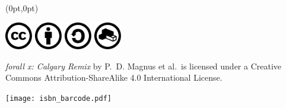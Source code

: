 \documentclass{memoir}
\newlength{\coverheight}
\newlength{\spinewidth}
\newlength{\spinepos} %
\begin{document}
\begin{textblock*}{\spinepos}(0pt,0pt)
  \noindent\hspace{1.5cm}
  \begin{minipage}[b][\coverheight][b]{.85\spinepos}
\begin{minipage}[b]{2.5cm}
\includegraphics[width=1.2cm]{assets/cc.pdf}
\includegraphics[width=1.2cm]{assets/by.pdf}
\includegraphics[width=1.2cm]{assets/sa.pdf}
\includegraphics[width=1.2cm]{assets/remix.pdf}
\end{minipage}
\hspace{.3cm}
\begin{minipage}[b]{4.7cm}
  \fontsize{11pt}{1.2em}\selectfont\color{white}\textit{forall x:
    Calgary Remix} by P.~D. Magnus et al.\ is licensed under a
  Creative Commons Attribution-Share\-Alike 4.0 International License.

\end{minipage}
\hfill\color{black}
\colorbox{white}{\texttt{[image: isbn\_barcode.pdf]}}

\vspace*{2cm}
  \end{minipage}
  \hfill
\end{textblock*}
\end{document}

